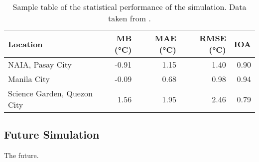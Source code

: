		\begin{table}[]
			\caption{
				Sample table of the statistical performance of the simulation.
				Data taken from \textcite{Bilang2022}.
			}
			\label{tab:sample-statistical-performance}
			\centering
			\begin{tabular}{lrrrr}
				\hline \hline
				Location                    & MB (\unit{\degreeCelsius})    & MAE (\unit{\degreeCelsius}) & RMSE (\unit{\degreeCelsius}) & IOA \\
				\hline
				NAIA, Pasay City            & -0.91 & 1.15 & 1.40 & 0.90 \\
				Manila City                 & -0.09 & 0.68 & 0.98 & 0.94 \\
				Science Garden, Quezon City & 1.56  & 1.95 & 2.46 & 0.79 \\
				\hline
			\end{tabular}
		\end{table}

	\subsection{Future Simulation}
		The future.